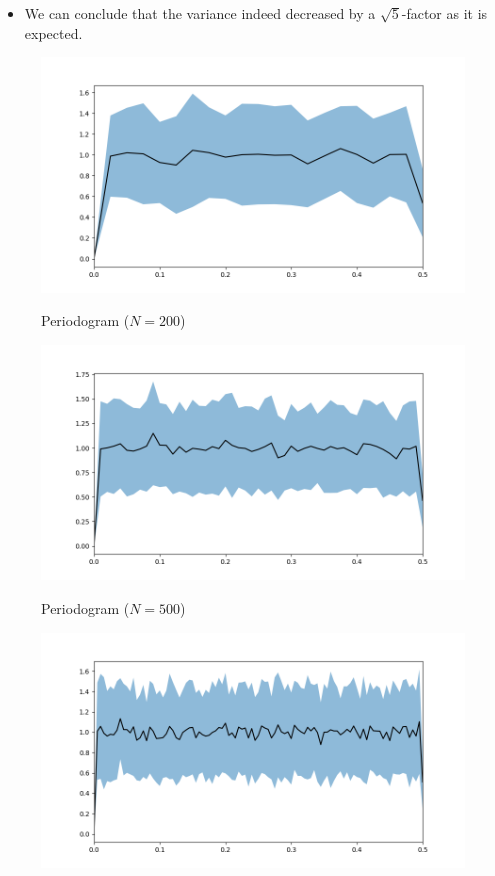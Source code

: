 \documentclass[11pt]{article}
\begin{document}
\begin{solution}

\begin{itemize}
    \item We can conclude that the variance indeed decreased by a $\sqrt{5}$-factor as it is expected.
\end{itemize}

\begin{figure}
    \centering
    \begin{minipage}[t]{0.3\textwidth}
    \centerline{\includegraphics[width=\textwidth]{imgs/periodoK200.png}}
    \centerline{Periodogram ($N=200$)}
    \end{minipage}
    \begin{minipage}[t]{0.3\textwidth}
    \centerline{\includegraphics[width=\textwidth]{imgs/periodoK500.png}}
    \centerline{Periodogram ($N=500$)}
    \end{minipage}
    \begin{minipage}[t]{0.3\textwidth}
    \centerline{\includegraphics[width=\textwidth]{imgs/periodoK1000.png}}

\end{minipage}
\end{figure}
\end{solution}
\end{document}
